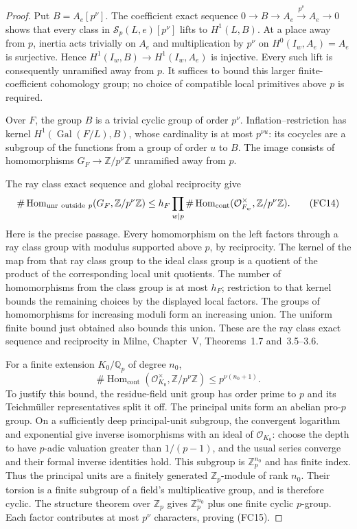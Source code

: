 \begin{proof}
Put $B=A_e[p^\nu]$. The coefficient exact sequence
$0\to B\to A_e\xrightarrow{p^\nu}A_e\to0$ shows that
every class in $\mathcal S_p(L,e)[p^\nu]$ lifts to
$H^1(L,B)$. At a place away from $p$, inertia acts
trivially on $A_e$ and multiplication by $p^\nu$ on
$H^0(I_w,A_e)=A_e$ is surjective. Hence
$H^1(I_w,B)\to H^1(I_w,A_e)$ is injective.
Every such lift is consequently unramified away from $p$.
It suffices to bound this larger finite-coefficient
cohomology group; no choice of compatible local
primitives above $p$ is required.

Over $F$, the group $B$ is a trivial cyclic group of
order $p^\nu$. Inflation--restriction has kernel
$H^1(\operatorname{Gal}(F/L),B)$, whose cardinality is at
most $p^{\nu u}$: its cocycles are a subgroup of the
functions from a group of order $u$ to $B$. The image
consists of homomorphisms $G_F\to\mathbb Z/p^\nu\mathbb Z$
unramified away from $p$.

The ray class exact sequence and global reciprocity give
\[
 \#\operatorname{Hom}_{\mathrm{unr}\ {\rm outside}\ p}
                   (G_F,\mathbb Z/p^\nu\mathbb Z)
 \le h_F\prod_{w\mid p}
       \#\operatorname{Hom}_{\mathrm{cont}}
                 (\mathcal O_{F_w}^{\times},\mathbb Z/p^\nu\mathbb Z).
                                                               \tag{FC14}
\]
Here is the precise passage. Every homomorphism on the
left factors through a ray class group with modulus
supported above $p$, by reciprocity. The kernel of the
map from that ray class group to the ideal class group
is a quotient of the product of the corresponding
local unit quotients. The number of homomorphisms from
the class group is at most $h_F$; restriction to that
kernel bounds the remaining choices by the displayed
local factors. The groups of homomorphisms for increasing
moduli form an increasing union. The uniform finite
bound just obtained also bounds this union.
These are the ray class exact sequence and reciprocity
in Milne, Chapter~V, Theorems~1.7 and~3.5--3.6.
\cite{milne-cft}

For a finite extension $K_0/\mathbb Q_p$ of degree $n_0$,
\[
 \#\operatorname{Hom}_{\mathrm{cont}}
        (\mathcal O_{K_0}^{\times},\mathbb Z/p^\nu\mathbb Z)
                         \le p^{\nu(n_0+1)}.                   \tag{FC15}
\]
To justify this bound, the residue-field unit group has
order prime to $p$ and its Teichm\"uller representatives
split it off. The principal units form an abelian pro-$p$
group. On a sufficiently deep principal-unit subgroup,
the convergent logarithm and exponential give inverse
isomorphisms with an ideal of $\mathcal O_{K_0}$: choose
the depth to have $p$-adic valuation greater than
$1/(p-1)$, and the usual series converge and their
formal inverse identities hold. This subgroup is
$\mathbb Z_p^{n_0}$ and has finite index. Thus the
principal units are a finitely generated
$\mathbb Z_p$-module of rank $n_0$. Their torsion is a
finite subgroup of a field's multiplicative group,
and is therefore cyclic. The structure theorem over
$\mathbb Z_p$ gives $\mathbb Z_p^{n_0}$ plus one finite
cyclic $p$-group. Each factor contributes at most
$p^\nu$ characters, proving (FC15).


\end{proof}
